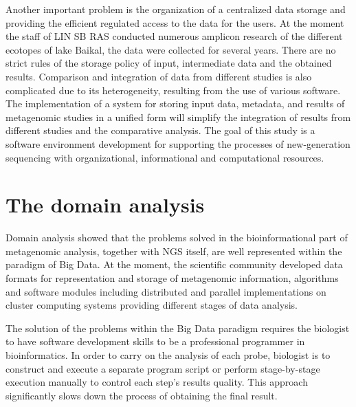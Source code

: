 \documentclass[conference,a4paper]{IEEEtran}
\begin{document}
Another important problem is the organization of a centralized data storage and providing the efficient regulated access to the data for the users.  At the moment the staff of LIN SB RAS conducted numerous amplicon research of the different ecotopes of lake Baikal, the data were collected for several years. There are no strict rules of the storage policy of input, intermediate data and the obtained results. Comparison and integration of data from different studies is also complicated due to its heterogeneity, resulting from the use of various software. The implementation of a system for storing input data, metadata, and results of metagenomic studies in a unified form will simplify the integration of results from different studies and the comparative analysis.
The goal of this study is a software environment development for supporting the processes of new-generation sequencing with organizational, informational and computational resources.

\section{The domain analysis}
\label{sec:doma}


Domain analysis showed that the problems solved in the bioinformational part of metagenomic analysis, together with NGS itself, are well represented within the paradigm of Big Data. At the moment, the scientific community developed data formats for representation and storage of metagenomic information, algorithms and software modules including distributed and parallel implementations on cluster computing systems providing different stages of data analysis.

The solution of the problems within the Big Data paradigm requires the biologist to have software development skills to be a professional programmer in bioinformatics. In order to carry on the analysis of each probe, biologist is to construct and execute a separate program script or perform stage-by-stage execution manually to control each step's results quality. This approach significantly slows down the process of obtaining the final result.
\end{document}
